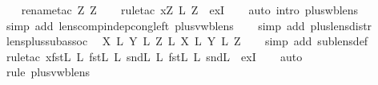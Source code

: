 \begin{isabellebody}
\ \ \isamarkupfalse%
\ {\isacharparenleft}rename{\isacharunderscore}tac\ Z\ Z\isanewline
\ \ \isamarkupfalse%
\ {\isacharparenleft}rule{\isacharunderscore}tac\ x{\isacharequal}{\isachardoublequoteopen}Z\ {\isacharplus}\isactrlsub L\ Z\ \ exI{\isacharparenright}\isanewline
\ \ \isamarkupfalse%
\ {\isacharparenleft}auto\ intro{\isacharbang}{\isacharcolon}\ plus{\isacharunderscore}wb{\isacharunderscore}lens{\isacharparenright}\isanewline
\ \ \isamarkupfalse%
\ {\isacharparenleft}simp\ add{\isacharcolon}\ lens{\isacharunderscore}comp{\isacharunderscore}indep{\isacharunderscore}cong{\isacharunderscore}left\ plus{\isacharunderscore}vwb{\isacharunderscore}lens{\isacharparenright}\isanewline
\ \ \isamarkupfalse%
\ {\isacharparenleft}simp\ add{\isacharcolon}\ plus{\isacharunderscore}lens{\isacharunderscore}distr{\isacharparenright}\isanewline
{}\isamarkupfalse%
%
\endisatagproof
{\isafoldproof}%
%
\isadelimproof
\isanewline
%
\endisadelimproof
\isanewline
{}\isamarkupfalse%
\ lens{\isacharunderscore}plus{\isacharunderscore}sub{\isacharunderscore}assoc{\isacharunderscore}{}{\isacharcolon}\isanewline
\ \ {\isachardoublequoteopen}X\ {\isacharplus}\isactrlsub L\ Y\ {\isacharplus}\isactrlsub L\ Z\ {\isasymsubseteq}\isactrlsub L\ {\isacharparenleft}X\ {\isacharplus}\isactrlsub L\ Y{\isacharparenright}\ {\isacharplus}\isactrlsub L\ Z{\isachardoublequoteclose}\isanewline
%
\isadelimproof
\ \ %
\endisadelimproof
%
\isatagproof
{}\isamarkupfalse%
\ {\isacharparenleft}simp\ add{\isacharcolon}\ sublens{\isacharunderscore}def{\isacharparenright}\isanewline
\ \ \isamarkupfalse%
\ {\isacharparenleft}rule{\isacharunderscore}tac\ x{\isacharequal}{\isachardoublequoteopen}{\isacharparenleft}fst\isactrlsub L\ {\isacharsemicolon}\isactrlsub L\ fst\isactrlsub L{\isacharparenright}\ {\isacharplus}\isactrlsub L\ {\isacharparenleft}snd\isactrlsub L\ {\isacharsemicolon}\isactrlsub L\ fst\isactrlsub L{\isacharparenright}\ {\isacharplus}\isactrlsub L\ snd\isactrlsub L{\isachardoublequoteclose}\ \ exI{\isacharparenright}\isanewline
\ \ \isamarkupfalse%
\ {\isacharparenleft}auto{\isacharparenright}\isanewline
\ \ \isamarkupfalse%
\ {\isacharparenleft}rule\ plus{\isacharunderscore}vwb{\isacharunderscore}lens{\isacharparenright}\isanewline

\end{isabellebody}
